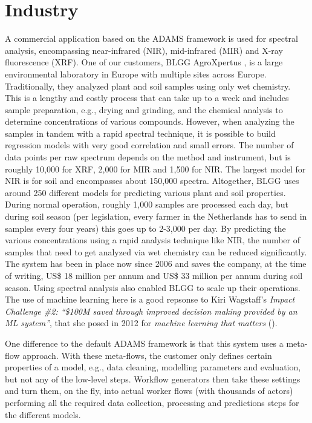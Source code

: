 \documentclass[wcp]{jmlr}
\begin{document}
\section{Industry}
A commercial application based on the ADAMS framework is used for spectral analysis, encompassing near-infrared (NIR), mid-infrared (MIR) and X-ray fluorescence (XRF). One of our customers, BLGG AgroXpertus
, is a large environmental laboratory in Europe with multiple sites across Europe. Traditionally, they analyzed plant and soil samples using only wet chemistry. This is a lengthy and costly process that can take up to a week and  includes sample preparation, e.g., drying and grinding, and the chemical analysis to determine concentrations of various compounds. However, when analyzing the samples in tandem with a rapid spectral technique, it is possible to build regression models with very good correlation and small errors. The number of data points per raw spectrum depends on the method and instrument, but is roughly 10,000 for XRF, 2,000 for MIR and 1,500 for NIR. The largest model for NIR is for soil and encompasses about 150,000 spectra. Altogether, BLGG uses around 250 different models for predicting various plant and soil properties. During normal operation, roughly 1,000 samples are processed each day, but during soil season (per legislation, every farmer in the Netherlands has to send in samples every four years) this goes up to 2-3,000 per day. By predicting the various concentrations using a rapid analysis technique like NIR, the number of samples that need to get analyzed via wet chemistry can be reduced significantly. The system has been in place now since 2006 and saves the company, at the time of writing, US\$ 18 million per annum and US\$ 33 million per annum during soil season. Using spectral analysis also enabled BLGG to scale up their operations. The use of machine learning here is a good repsonse to Kiri Wagstaff's \textit{Impact Challenge \#2: ``\$100M saved through improved decision making provided by an ML system''}, that she posed in 2012 for \textit{machine learning that matters} (\cite{wagstaff}).

One difference to the default ADAMS framework is that this system uses a meta-flow approach. With these meta-flows, the customer only defines certain properties of a model, e.g., data cleaning, modelling parameters and evaluation, but not any of the low-level steps. Workflow generators then take these settings and turn them, on the fly, into actual worker flows (with thousands of actors) performing all the required data collection, processing and predictions steps for the different models.



\end{document}
